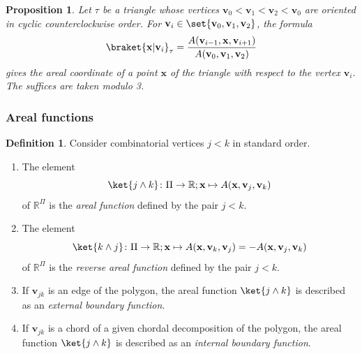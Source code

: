 \documentclass[12pt]{amsart}
\theoremstyle{plain}
\newtheorem{proposition}[theorem]{Proposition}
\theoremstyle{definition}
\newtheorem{definition}[theorem]{Definition}
\numberwithin{equation}{section}
\begin{document}
\begin{proposition}\label{P:ArCordFn}
Let $\tau$ be a triangle whose vertices $\mathbf v_0<\mathbf v_1<\mathbf v_2<\mathbf v_0$ are oriented in cyclic counterclockwise order. For $\mathbf v_i\in\set{\mathbf v_0,\mathbf v_1,\mathbf v_2}$, the formula
\begin{equation}\label{E:ArCordFn}
\braket{\mathbf x|\mathbf v_i}_\tau=
\frac{A(\mathbf v_{i-1},\mathbf x,\mathbf v_{i+1})}{A(\mathbf v_0,\mathbf v_1,\mathbf v_2)}
\end{equation}
gives the areal coordinate of a point $\mathbf x$ of the triangle with respect to the vertex $\mathbf v_i$. The suffices are taken modulo 3.
\end{proposition}




\subsubsection{Areal functions}\label{SSS:ArealFun}



\begin{definition}\label{D:ArealFun}
Consider combinatorial vertices $j<k$ in standard order.
\begin{enumerate}
\item[$(\mathrm a)$]
The element
\begin{equation}\label{E:ArealFun}
\ket{j\wedge k}\colon \Pi\to\mathbb R;
\mathbf x\mapsto A(\mathbf x,\mathbf v_j,\mathbf v_k)
\end{equation}
of $\mathbb R^\Pi$ is the \emph{areal function} defined by the pair $j<k$.
\item[$(\mathrm b)$]
The element
\begin{equation*}
\ket{k\wedge j}\colon \Pi\to\mathbb R;
\mathbf x\mapsto A(\mathbf x,\mathbf v_k,\mathbf v_j)
=-A(\mathbf x,\mathbf v_j,\mathbf v_k)
\end{equation*}
of $\mathbb R^\Pi$ is the \emph{reverse areal function} defined by the pair $j<k$.
\item[$(\mathrm c)$]
If $\mathbf v_{jk}$ is an edge of the polygon, the areal function $\ket{j\wedge k}$ is described as an \emph{external boundary function}.
\item[$(\mathrm d)$]
If $\mathbf v_{jk}$ is a chord of a given chordal decomposition of the polygon, the areal function $\ket{j\wedge k}$ is described as an \emph{internal boundary function}.
\end{enumerate}
\end{definition}
\end{document}
